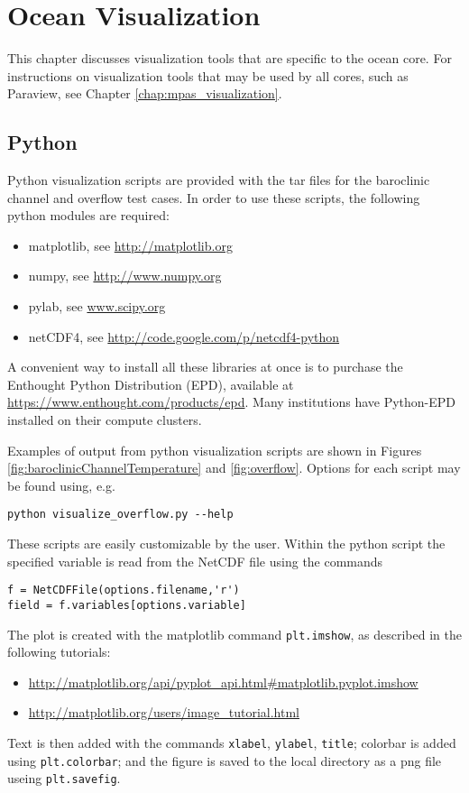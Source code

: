\chapter{Ocean Visualization}
\label{chap:ocean_visualization}

This chapter discusses visualization tools that are specific to the ocean core.  For instructions on visualization tools that may be used by all cores, such as Paraview, see Chapter \ref{chap:mpas_visualization}.

\section{Python}
\label{sec:ocean_python}

Python visualization scripts are provided with the tar files for the baroclinic channel and overflow test cases.  In order to use these scripts, the following python modules are required:
\begin{itemize}
\item matplotlib, see \url{http://matplotlib.org}
\item numpy, see \url{http://www.numpy.org}
\item pylab, see \url{www.scipy.org}
\item netCDF4, see \url{http://code.google.com/p/netcdf4-python}
\end{itemize}
A convenient way to install all these libraries at once is to purchase the Enthought Python Distribution (EPD), available at \url{https://www.enthought.com/products/epd}.  Many institutions have Python-EPD installed on their compute clusters.

Examples of output from python visualization scripts are shown in Figures \ref{fig:baroclinicChannelTemperature} and \ref{fig:overflow}.  Options for each script may be found using, e.g.
\begin{verbatim}
python visualize_overflow.py --help
\end{verbatim}
These scripts are easily customizable by the user.  Within the python script the specified variable is read from the NetCDF file using the commands
\begin{verbatim}
f = NetCDFFile(options.filename,'r')
field = f.variables[options.variable]
\end{verbatim}
The plot is created with the matplotlib command {\tt plt.imshow}, as described in the following tutorials:
\begin{itemize}
\item \url{http://matplotlib.org/api/pyplot_api.html#matplotlib.pyplot.imshow}
\item \url{http://matplotlib.org/users/image_tutorial.html}
\end{itemize}
Text is then added with the commands {\tt xlabel}, {\tt ylabel}, {\tt title}; colorbar is added using {\tt plt.colorbar}; and the figure is saved to the local directory as a png file useing {\tt plt.savefig}.
